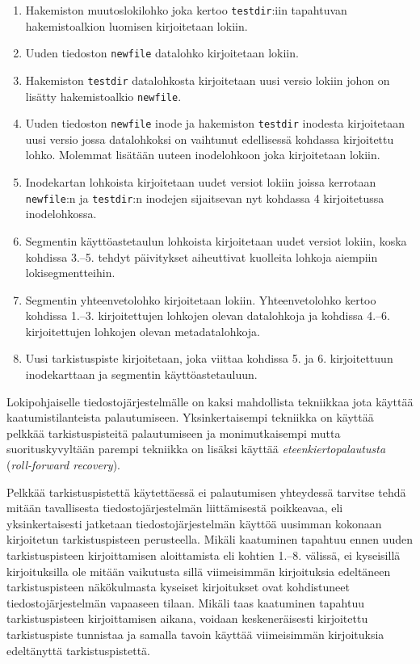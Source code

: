 \begin{enumerate}
    \item{Hakemiston muutoslokilohko joka kertoo \texttt{testdir}:iin tapahtuvan hakemistoalkion luomisen kirjoitetaan lokiin.}
    \item{Uuden tiedoston \texttt{newfile} datalohko kirjoitetaan lokiin.}
    \item{Hakemiston \texttt{testdir} datalohkosta kirjoitetaan uusi versio lokiin johon on lisätty hakemistoalkio \texttt{newfile}.}
    \item{Uuden tiedoston \texttt{newfile} inode ja hakemiston \texttt{testdir} inodesta kirjoitetaan uusi versio jossa datalohkoksi on vaihtunut edellisessä kohdassa kirjoitettu lohko. Molemmat lisätään uuteen inodelohkoon joka kirjoitetaan lokiin.}
    \item{Inodekartan lohkoista kirjoitetaan uudet versiot lokiin joissa kerrotaan \texttt{newfile}:n ja \texttt{testdir}:n inodejen sijaitsevan nyt kohdassa 4 kirjoitetussa inodelohkossa.}
    \item{Segmentin käyttöastetaulun lohkoista kirjoitetaan uudet versiot lokiin, koska kohdissa 3.--5. tehdyt päivitykset aiheuttivat kuolleita lohkoja aiempiin lokisegmentteihin.}
    \item{Segmentin yhteenvetolohko kirjoitetaan lokiin. Yhteenvetolohko kertoo kohdissa 1.--3. kirjoitettujen lohkojen olevan datalohkoja ja kohdissa 4.--6. kirjoitettujen lohkojen olevan metadatalohkoja.}
    \item{Uusi tarkistuspiste kirjoitetaan, joka viittaa kohdissa 5. ja 6. kirjoitettuun inodekarttaan ja segmentin käyttöastetauluun.}
\end{enumerate}
Lokipohjaiselle tiedostojärjestelmälle on kaksi mahdollista tekniikkaa jota käyttää kaatumistilanteista palautumiseen.
Yksinkertaisempi tekniikka on käyttää pelkkää tarkistuspisteitä palautumiseen ja monimutkaisempi mutta suorituskyvyltään parempi tekniikka on lisäksi käyttää \emph{eteenkiertopalautusta} (\emph{roll-forward recovery}).

Pelkkää tarkistuspistettä käytettäessä ei palautumisen yhteydessä tarvitse tehdä mitään tavallisesta tiedostojärjestelmän liittämisestä poikkeavaa,
eli yksinkertaisesti jatketaan tiedostojärjestelmän käyttöä uusimman kokonaan kirjoitetun tarkistuspisteen perusteella.
Mikäli kaatuminen tapahtuu ennen uuden tarkistuspisteen kirjoittamisen aloittamista eli kohtien 1.--8. välissä,
ei kyseisillä kirjoituksilla ole mitään vaikutusta sillä viimeisimmän kirjoituksia edeltäneen tarkistuspisteen näkökulmasta kyseiset kirjoitukset ovat kohdistuneet tiedostojärjestelmän vapaaseen tilaan.
Mikäli taas kaatuminen tapahtuu tarkistuspisteen kirjoittamisen aikana,
voidaan keskeneräisesti kirjoitettu tarkistuspiste tunnistaa ja samalla tavoin käyttää viimeisimmän kirjoituksia edeltänyttä tarkistuspistettä.

